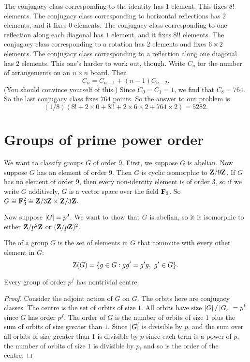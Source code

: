 \documentclass[11pt, twoside]{amsart}
\begin{document}
The conjugacy class corresponding to the identity has $1$ element. This fixes $8!$ elements. The conjugacy class corresponding to horizontal reflections has $2$ elements, and it fixes $0$ elements. The conjugacy class corresponding to one reflection along each diagonal has $1$ element, and it fixes $8!!$ elements. The conjugacy class corresponding to a rotation has $2$ elements and fixes $6\times 2$ elements. The conjugacy class corresponding to a reflection along one diagonal has $2$ elements. This one's harder to work out, though. Write $C_n$ for the number of arrangements on an $n\times n$ board. Then 
$$
C_n = C_{n-1} + (n-1)C_{n-2}.
$$
(You should convince yourself of this.) Since $C_0=C_1=1$, we find that $C_8= 764$. So the last conjugacy class fixes $764$ points. So the answer to our problem is 
$$
(1/8){(8! + 2\times 0 + 8!! + 2\times 6\times 2 + 764\times 2 )}= 5282.
$$

\section{Groups of prime power order}
We want to classify groups $G$ of order $9$. First, we suppose $G$ is abelian. Now suppose $G$ has an element of order $9$. Then $G$ is cyclic isomorphic to $\mathbf{Z}/9\mathbf{Z} $. If $G$ has no element of order $9$, then every non-identity element is of order $3$, so if we write $G$ additively, $G$ is a vector space over the field $\mathbf F_3$. So $G\cong \mathbf F_3^2 \cong \mathbf{Z}/3\mathbf{Z} \times \mathbf{Z}/3\mathbf{Z}$.

Now suppose $\left \lvert G \right \rvert = p^2$. We want to show that $G$ is abelian, so it is isomorphic to either $\mathbf{Z}/p^2\mathbf{Z}$ or $(\mathbf{Z}/p\mathbf{Z})^2$. 
\begin{definition}
The  of a group $G$ is the set of elements in $G$ that commute with every other element in $G$:
$$
\operatorname{Z}(G) = \{ g\in G : gg' = g'g, \ g'\in G\}.
$$
\end{definition}

\begin{proposition}\label{yes}
Every group of order $p^f$ has nontrivial centre. 
\end{proposition}
\begin{proof}
Consider the adjoint action of $G$ on $G$. The orbits here are conjugacy classes. The centre is the set of orbits of size $1$. All orbits have size $\left \lvert G \right \rvert/\left \lvert G_s \right \rvert = p^k$ since $G$ has order $p^f$. The order of $G$ is the number of orbits of size $1$ plus the sum of orbits of size greater than $1$. Since $\left \lvert G \right \rvert$ is divisible by $p$, and the sum over all orbits of size greater than $1$ is divisible by $p$ since each term is a power of $p$, the number of orbits of size $1$ is divisible by $p$, and so is the order of the centre.  
\end{proof}
\end{document}
